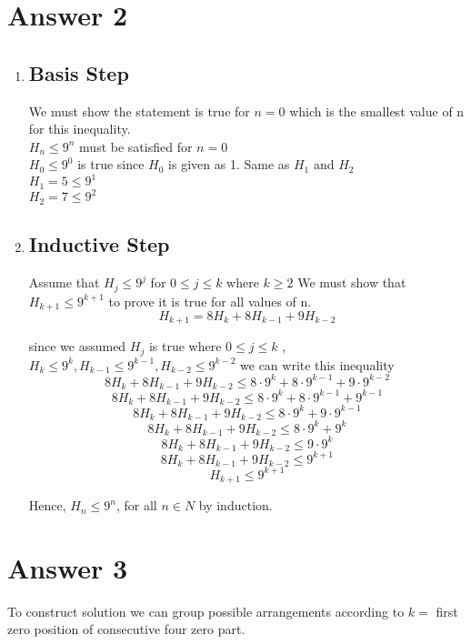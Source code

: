 \documentclass[12pt]{article}
\begin{document}
\section*{Answer 2}
\noindent 

\begin{enumerate}[1)]
    \item 
        \subsection*{Basis Step}
            We must show the statement is true for $ n = 0$ which is the smallest value of n for this inequality. \\
            $H_{n} \leq 9^n $ must be satisfied for $ n= 0$ \\
            $H_{0} \leq 9^0 $ is true since $H_{0}$ is given as 1. Same as $ H_{1}$ and $H_{2}$\\
            $H_{1} = 5\leq 9^1$ \\
            $H_{2} = 7\leq 9^2$
    \item
        \subsection*{Inductive Step}
            Assume that $H_{j} \leq 9^j$ for $ 0 \leq j \leq k $ where $ k \geq 2$ We must show that $H_{k+1} \leq 9^{k+1}$ to prove it is true for all values of n. 
            $$H_{k+1} = 8H_{k} + 8H_{k-1} + 9H_{k-2}$$
            
            since we assumed $H_{j}$ is true where $0 \leq j \leq k$ , $H_{k} \leq 9^{k}, H_{k-1} \leq 9^{k-1} , H_{k-2} \leq 9^{k-2}$ we can write this inequality\\
            $$8H_{k} + 8H_{k-1} + 9H_{k-2}\leq 8 \cdot 9^{k} + 8 \cdot 9^{k-1} + 9 \cdot 9^{k-2} $$
            $$ 8H_{k} + 8H_{k-1} + 9H_{k-2}\leq 8 \cdot 9^{k} + 8 \cdot 9^{k-1} + 9^{k-1}$$
            $$ 8H_{k} + 8H_{k-1} + 9H_{k-2}\leq 8 \cdot 9^{k} + 9 \cdot 9^{k-1} $$
            $$ 8H_{k} + 8H_{k-1} + 9H_{k-2}\leq 8 \cdot 9^{k} +  9^{k} $$
            $$ 8H_{k} + 8H_{k-1} + 9H_{k-2}\leq 9 \cdot 9^{k} $$
            $$ 8H_{k} + 8H_{k-1} + 9H_{k-2}\leq 9^{k+1} $$
            $$ H_{k+1} \leq 9^{k+1}$$
            
            Hence, $H_n \leq 9^n$, for all $n \in  N$ by induction.
\end{enumerate}{}
\pagebreak

\section*{Answer 3}
To construct solution we can group possible arrangements according to $k = $ first zero position of consecutive four zero part. 
\end{document}
